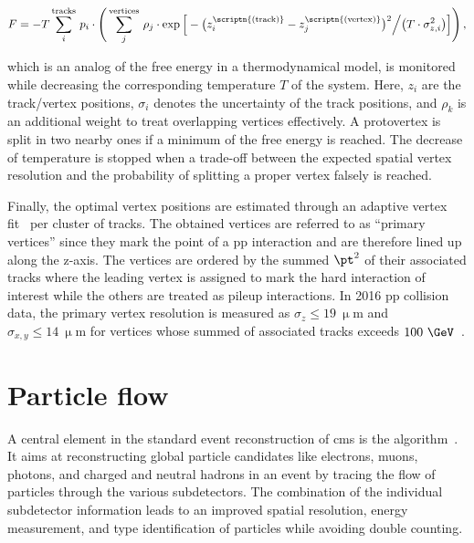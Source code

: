 \begin{equation}
F=-T\sum_{i}^\mathrm{tracks}\,p_{i}\cdot\Bigg(\sum_{j}^\mathrm{vertices}\,\rho_{j}\cdot\exp\Big[-\big(z_{i}^\scriptn{\mathrm{(track)}}-z_{j}^\scriptn{\mathrm{(vertex)}}\big)^2\Big/\big(T\cdot\sigma_{z,i}^2\big)\Big]\Bigg)\,,
\end{equation}
 
which is an analog of the free energy in a thermodynamical model, is monitored while decreasing the corresponding temperature $T$ of the system. Here, $z_{i}$ are the track/vertex positions, $\sigma_{i}$ denotes the uncertainty of the track positions, and $\rho_{k}$ is an additional weight to treat overlapping vertices effectively. A protovertex is split in two nearby ones if a minimum of the free energy is reached. The decrease of temperature is stopped when a trade-off between the expected spatial vertex resolution and the probability of splitting a proper vertex falsely is reached.

Finally, the optimal vertex positions are estimated through an adaptive vertex fit~\cite{0954-3899-34-12-N01} per cluster of tracks. The obtained vertices are referred to as ``primary vertices'' since they mark the point of a \gls{pp} interaction and are therefore lined up along the z-axis. The vertices are ordered by the summed $\pt^2$ of their associated tracks where the leading vertex is assigned to mark the hard interaction of interest while the others are treated as pileup interactions. In 2016 \gls{pp} collision data, the primary vertex resolution is measured as $\sigma_{z}\leq19~\upmu\mathrm{m}$ and $\sigma_{x,y}\leq14~\upmu\mathrm{m}$ for vertices whose summed \pt of associated tracks exceeds $100~\GeV$~\cite{CMS-DP-2016-041}.



\section{Particle flow}


A central element in the standard event reconstruction of \gls{cms} is the  algorithm~\cite{CMS:2009nxa}. It aims at reconstructing global particle candidates like electrons, muons, photons, and charged and neutral hadrons in an event by tracing the flow of particles through the various subdetectors. The combination of the individual subdetector information leads to an improved spatial resolution, energy measurement, and type identification of particles while avoiding double counting.

